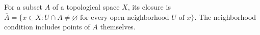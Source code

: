 
For a subset $A$ of a topological space $X$, its closure is $\overline A=\{x\in X: U\cap A\ne\varnothing\text{ for every open neighborhood }U\text{ of }x\}$. The neighborhood condition includes points of $A$ themselves.
